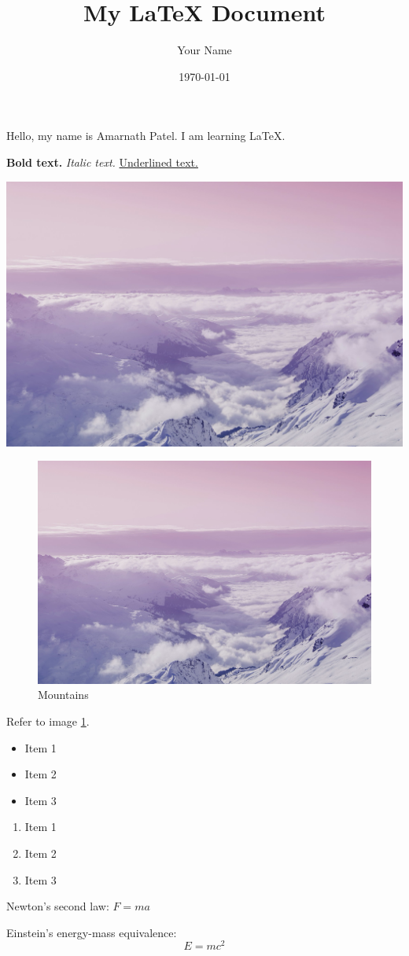 \documentclass{article}
\begin{document}
\title{My LaTeX Document}
\author{Your Name}
\date{\today}

\maketitle

Hello, my name is Amarnath Patel. I am learning LaTeX.


\textbf{Bold text.} \textit{Italic text.} \underline{Underlined text.}

\includegraphics{image.png} %

\begin{figure}[h]
\includegraphics{image.png}
\caption{Mountains}
\label{fig:my_label}
\end{figure}

Refer to image \ref{fig:my_label}.

\begin{itemize}
\item Item 1
\item Item 2
\item Item 3
\end{itemize}

\begin{enumerate}
\item Item 1
\item Item 2
\item Item 3
\end{enumerate}

Newton's second law: $F = ma$

Einstein's energy-mass equivalence:
\[
E = mc^2
\]
\end{document}
